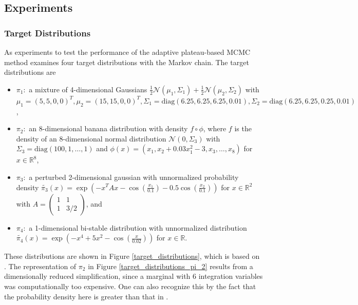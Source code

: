 \documentclass{scrartcl}
\begin{document}
    \subsection{Experiments}
    \subsubsection{Target Distributions}
    As experiments to test the performance of the adaptive plateau-based MCMC method \cite{lau2019} examines four target distributions
    with the Markov chain. The target distributions are
    \begin{itemize}
        \item $\pi_1:$ a mixture of 4-dimensional Gaussians $\frac12\mathcal{N}(\mu_1,\Sigma_1)+\frac12\mathcal{N}(\mu_2,\Sigma_2)$ with $\mu_1=(5,5,0,0)^T,\mu_2=(15,15,0,0)^T,\Sigma_1=\text{diag}(6. 25,6.25,6.25,0.01),\Sigma_2=\text{diag}(6.25,6.25,0.25,0.01)$,
        \item $\pi_2:$ an 8-dimensional banana distribution with density $f\circ\phi$, where $f$ is the density of an 8-dimensional normal distribution $\mathcal{N}(0,\Sigma_3)$ with $\Sigma_3=\text{diag}(100,1,\dots,1)$ and $\phi(x)=(x_1,x_2+0. 03x_1^2-3,x_3,\dots,x_8)$ for $x\in\mathbb{R}^8$,
        \item $\pi_3:$ a perturbed 2-dimensional gaussian with unnormalized probability density $\tilde{\pi_3}(x)=\exp\left( -x^TAx-\cos\left( \frac{x_1}{0.1} \right) -0.5\cos\left( \frac{x_2}{0.1} \right) \right)$ for $x\in\mathbb{R}^2$ with
        $A=\begin{pmatrix}
                    1 & 1\\
                    1 & 3/2
        \end{pmatrix}$, and
        \item $\pi_4:$ a 1-dimensional bi-stable distribution with unnormalized distribution $\tilde{\pi_4}(x)=\exp\left( -x^4+5x^2-\cos\left( \frac{x}{0.02} \right) \right)$ for $x\in\mathbb{R}$.
    \end{itemize}
    These distributions are shown in Figure \ref{target_distributions}, which is based on \cite[Figure 3]{lau2019}. The representation
    of $\pi_2$ in Figure \ref{target_distributions_pi_2} results from a dimensionally reduced simplification, since a marginal with 6 integration variables was computationally too expensive. One can also recognize this by the fact that the probability density here is greater than that in \cite{lau2019}.
\end{document}
